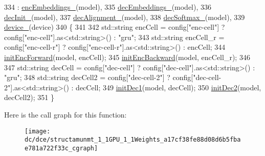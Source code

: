 \begin{DoxyCode}
334   : \hyperlink{structamunmt_1_1GPU_1_1Weights_aa829b8f4fe98e626cec7943d544eeb8a}{encEmbeddings\_}(model),
335     \hyperlink{structamunmt_1_1GPU_1_1Weights_ad38dafd4e5728942b6cda10bacefdf90}{decEmbeddings\_}(model),
336     \hyperlink{structamunmt_1_1GPU_1_1Weights_a5b9ce1181f97a74b6cfaaf8885b14de7}{decInit\_}(model),
337     \hyperlink{structamunmt_1_1GPU_1_1Weights_ae42172415ad97ecd7f25f4038ee1e7ec}{decAlignment\_}(model),
338     \hyperlink{structamunmt_1_1GPU_1_1Weights_aaebd4d22c9dcebd7e000ecad3b154c38}{decSoftmax\_}(model),
339     \hyperlink{structamunmt_1_1GPU_1_1Weights_ac3a0d691e36aafe2377ccbd9270aa642}{device\_}(device)
340     \{
341 
342       std::string encCell = config[\textcolor{stringliteral}{"enc-cell"}] ? config[\textcolor{stringliteral}{"enc-cell"}].as<std::string>() : \textcolor{stringliteral}{"gru"};
343       std::string encCell\_r = config[\textcolor{stringliteral}{"enc-cell-r"}] ? config[\textcolor{stringliteral}{"enc-cell-r"}].as<std::string>() : encCell;
344       \hyperlink{structamunmt_1_1GPU_1_1Weights_a0c173121920f426f51efddb518f92650}{initEncForward}(model, encCell);
345       \hyperlink{structamunmt_1_1GPU_1_1Weights_adfb2ca7faf26debdbbad12e2b5957bd4}{initEncBackward}(model, encCell\_r);
346 
347       std::string decCell = config[\textcolor{stringliteral}{"dec-cell"}] ? config[\textcolor{stringliteral}{"dec-cell"}].as<std::string>() : \textcolor{stringliteral}{"gru"};
348       std::string decCell2 = config[\textcolor{stringliteral}{"dec-cell-2"}] ? config[\textcolor{stringliteral}{"dec-cell-2"}].as<std::string>() : decCell;
349       \hyperlink{structamunmt_1_1GPU_1_1Weights_aa83a05e029a0f893b62dd3854474e144}{initDec1}(model, decCell);
350       \hyperlink{structamunmt_1_1GPU_1_1Weights_ae0137c30edfe7541a35a09907ecbb76a}{initDec2}(model, decCell2);
351     \}
\end{DoxyCode}


Here is the call graph for this function\+:
\nopagebreak
\begin{figure}[H]
\begin{center}
\leavevmode
\texttt{[image: dc/dce/structamunmt\_1\_1GPU\_1\_1Weights\_a17cf38fe88d08d6b5fbae781a722f33c\_cgraph]}
\end{center}
\end{figure}


